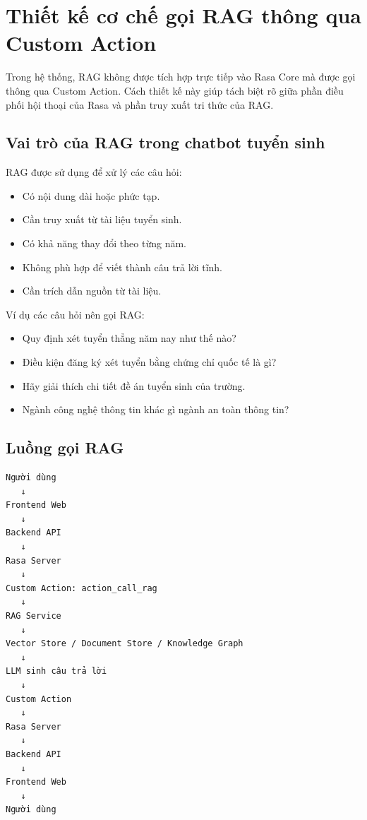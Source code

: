 ﻿\section{Thiết kế cơ chế gọi RAG thông qua Custom Action}

Trong hệ thống, RAG không được tích hợp trực tiếp vào Rasa Core mà được gọi thông qua Custom Action. Cách thiết kế này giúp tách biệt rõ giữa phần điều phối hội thoại của Rasa và phần truy xuất tri thức của RAG.

\subsection*{Vai trò của RAG trong chatbot tuyển sinh}

RAG được sử dụng để xử lý các câu hỏi:
\begin{itemize}
    \item Có nội dung dài hoặc phức tạp.
    \item Cần truy xuất từ tài liệu tuyển sinh.
    \item Có khả năng thay đổi theo từng năm.
    \item Không phù hợp để viết thành câu trả lời tĩnh.
    \item Cần trích dẫn nguồn từ tài liệu.
\end{itemize}

Ví dụ các câu hỏi nên gọi RAG:
\begin{itemize}
    \item Quy định xét tuyển thẳng năm nay như thế nào?
    \item Điều kiện đăng ký xét tuyển bằng chứng chỉ quốc tế là gì?
    \item Hãy giải thích chi tiết đề án tuyển sinh của trường.
    \item Ngành công nghệ thông tin khác gì ngành an toàn thông tin?
\end{itemize}

\subsection*{Luồng gọi RAG}

\begin{verbatim}
Người dùng
   ↓
Frontend Web
   ↓
Backend API
   ↓
Rasa Server
   ↓
Custom Action: action_call_rag
   ↓
RAG Service
   ↓
Vector Store / Document Store / Knowledge Graph
   ↓
LLM sinh câu trả lời
   ↓
Custom Action
   ↓
Rasa Server
   ↓
Backend API
   ↓
Frontend Web
   ↓
Người dùng
\end{verbatim}

